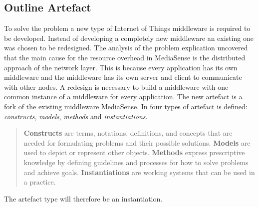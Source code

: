 \subsection{Outline Artefact}
To solve the problem a new type of Internet of Things middleware is required to be developed. Instead of developing a completely new middleware an existing one was chosen to be redesigned. The analysis of the problem explication uncovered that the main cause for the resource overhead in MediaSense is the distributed approach of the network layer. This is because every application has its own middleware and the middleware has its own server and client to communicate with other nodes. A redesign is necessary to build a middleware with one common instance of a middleware for every application. The new artefact is a fork of the existing middleware MediaSense. In \cite{johannesson2012design} four types of artefact is defined: \emph{constructs}, \emph{models}, \emph{methods} and \emph{instantiations}.  

\begin{quotation}
  \textbf{Constructs} are terms, notations, definitions, and concepts that are needed for formulating problems and their possible solutions.
  \textbf{Models} are used to depict or represent other objects.
  \textbf{Methods} express prescriptive knowledge by defining guidelines and processes for how to solve problems and achieve goals.
  \textbf{Instantiations} are working systems that can be used in a practice.
\end{quotation}
The artefact type will therefore be an instantiation.
